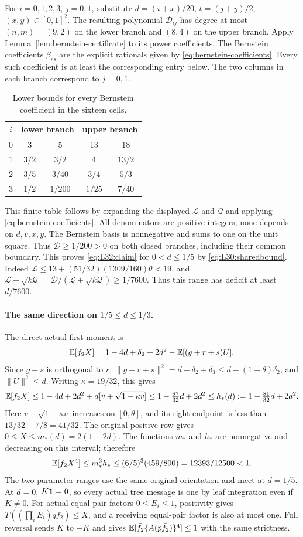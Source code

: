 For \(i=0,1,2,3\), \(j=0,1\), substitute
\(d=(i+x)/20\), \(t=(j+y)/2\), \((x,y)\in[0,1]^2\).
The resulting polynomial \(\mathcal D_{ij}\) has degree at most
\((n,m)=(9,2)\) on the lower branch and \((8,4)\) on the upper branch.
Apply Lemma~\ref{lem:bernstein-certificate} to its power coefficients.
The Bernstein coefficients \(\beta_{rs}\) are the explicit rationals
given by \eqref{eq:bernstein-coefficients}.
Every such coefficient is at least the corresponding entry below.
The two columns in each branch correspond to \(j=0,1\).
\begin{table}[htbp]\centering\small
\caption{Lower bounds for every Bernstein coefficient in the sixteen cells.}
\label{tab:reference-synthesis:bernstein}
\begin{tabular}{c|cc|cc}
\(i\)&\multicolumn{2}{c|}{lower branch}&\multicolumn{2}{c}{upper branch}\\
\hline
0&3&5&13&18\\
1&\(3/2\)&\(3/2\)&4&\(13/2\)\\
2&\(3/5\)&\(3/40\)&\(3/4\)&\(5/3\)\\
3&\(1/2\)&\(1/200\)&\(1/25\)&\(7/40\)
\end{tabular}
\end{table}
This finite table follows by expanding the displayed \(\mathcal L\)
and \(\mathcal Q\) and applying
\eqref{eq:bernstein-coefficients}. 
All denominators are positive integers; none depends on \(d,v,x,y\).
The Bernstein basis is nonnegative and sums to one on the unit square.
Thus \(\mathcal D\ge1/200>0\) on both closed branches, including
their common boundary. This proves \eqref{eq:L32:claim} for
\(0<d\le1/5\) by \eqref{eq:L30:sharedbound}.
Indeed \(\mathcal L\le13+(51/32)(1309/160)\theta<19\), and
\(\mathcal L-\sqrt{k\mathcal Q}
=\mathcal D/(\mathcal L+\sqrt{k\mathcal Q})\ge1/7600\).
Thus this range has deficit at least \(d/7600\).

\paragraph{The same direction on \(1/5\le d\le1/3\).}
The direct actual first moment is
\[
 \mathbb E[f_2X]=1-4d+\delta_2+2d^2-\mathbb E[(g+r+s)U].
\]
Since \(g+s\) is orthogonal to \(r\),
\(\|g+r+s\|^2=d-\delta_2+\delta_3
 \le d-(1-\theta)\delta_2\), and \(\|U\|^2\le d\).
Writing \(\kappa=19/32\), this gives
\[
 \mathbb E[f_2X]\le1-4d+2d^2+d[v+\sqrt{1-\kappa v}]
 \le1-\tfrac{87}{32}d+2d^2
 \le h_*(d):=1-\tfrac{81}{32}d+2d^2.
\]
Here \(v+\sqrt{1-\kappa v}\) increases on \([0,\theta]\),
and its right endpoint is less than \(13/32+7/8=41/32\).
The original positive row gives \(0\le X\le m_*(d)=2(1-2d)\).
The functions \(m_*\) and \(h_*\) are nonnegative and decreasing
on this interval; therefore
\[
 \mathbb E[f_2X^4]\le m_*^3h_*
 \le(6/5)^3(459/800)=12393/12500<1.
\]
The two parameter ranges use the same original orientation and meet
at \(d=1/5\). At \(d=0\), \(K\mathbf1=0\), so every actual tree message
is one by leaf integration even if \(K\ne0\).
For actual equal-pair factors \(0\le E_i\le1\), positivity gives
\(T((\prod_iE_i)qf_2)\le X\), and a receiving equal-pair factor
is also at most one. Full reversal sends \(K\) to \(-K\) and gives
\(\mathbb E[\bar f_2\{A(p\bar f_2)\}^4]\le1\) with the same strictness.
